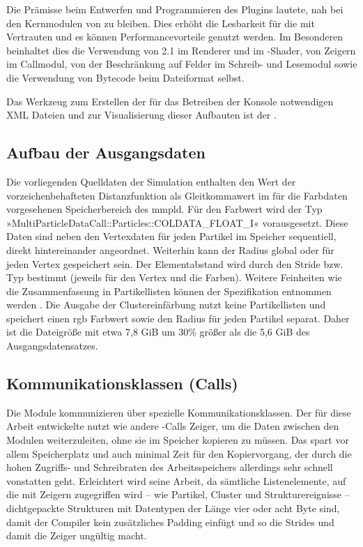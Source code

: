 Die Prämisse beim Entwerfen und Programmieren des Plugins lautete, nah bei den Kernmodulen von  zu bleiben. Dies erhöht die Lesbarkeit für die mit  Vertrauten und es können Performancevorteile genutzt werden. Im Besonderen beinhaltet dies die Verwendung von  2.1 im Renderer und im -Shader, von Zeigern im Callmodul, von der Beschränkung auf Felder im Schreib- und Lesemodul sowie die Verwendung von Bytecode beim Dateiformat selbst.

Das Werkzeug zum Erstellen der für das Betreiben der  Konsole notwendigen \gls{XML} Dateien und zur Visualisierung dieser Aufbauten ist der .

\subsection*{Aufbau der Ausgangsdaten}\label{sec:pluginaufbau-mmpld}
Die vorliegenden Quelldaten der Simulation enthalten den Wert der vorzeichenbehafteten Distanzfunktion als Gleitkommawert im für die Farbdaten vorgesehenen Speicherbereich des \gls{mmpld}. Für den Farbwert wird der Typ »MultiParticleDataCall::Particles::COLDATA\_FLOAT\_I« vorausgesetzt. Diese Daten sind neben den Vertexdaten für jeden Partikel im Speicher sequentiell, direkt hintereinander angeordnet. Weiterhin kann der Radius global oder für jeden Vertex gespeichert sein. Der Elementabstand wird durch den Stride bzw. Typ bestimmt (jeweils für den Vertex und die Farben). Weitere Feinheiten wie die Zusammenfassung in Partikellisten können der Spezifikation entnommen werden \cite[S.~3]{FileFormatSpecificationMMPLD}. Die Ausgabe der Clustereinfärbung nutzt keine Partikellisten und speichert einen \gls{rgb} Farbwert sowie den Radius für jeden Partikel separat. Daher ist die Dateigröße mit etwa 7,8 \gls{GiB} um 30\% größer als die 5,6 \gls{GiB} des Ausgangsdatensatzes.

\subsection*{Kommunikationsklassen (Calls)}
Die Module kommunizieren über spezielle Kommunikationsklassen. Der für diese Arbeit entwickelte  nutzt wie andere -Calls Zeiger, um die Daten zwischen den Modulen weiterzuleiten, ohne sie im Speicher kopieren zu müssen. Das spart vor allem Speicherplatz und auch minimal Zeit für den Kopiervorgang, der durch die hohen Zugriffs- und Schreibraten des Arbeitsspeichers allerdings sehr schnell vonstatten geht. Erleichtert wird seine Arbeit, da sämtliche Listenelemente, auf die mit Zeigern zugegriffen wird -- wie Partikel, Cluster und Strukturereignisse -- dichtgepackte Strukturen mit Datentypen der Länge vier oder acht Byte sind, damit der Compiler kein zusätzliches Padding einfügt und so die Strides und damit die Zeiger ungültig macht.

